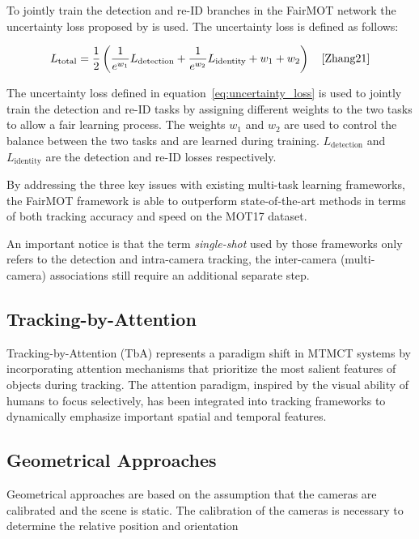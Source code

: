 To jointly train the detection and re-ID branches in the FairMOT network the uncertainty loss proposed by \textcite{Cipolla18} is used. The uncertainty loss is defined as follows:

\begin{equation}
    \label{eq:uncertainty_loss}
    L_{\text{total}}=\frac{1}{2}\left(\frac{1}{e^{w_1}} L_{\text{detection}}+\frac{1}{e^{w_2}} L_{\text{identity}}+w_1+w_2\right)
    \quad\text{\cite[Eq.~5]{Zhang21}}
\end{equation}

The uncertainty loss defined in equation~\ref{eq:uncertainty_loss} is used to jointly train the detection and re-ID tasks by assigning different weights to the two tasks to allow a fair learning process. The weights \(w_1\) and \(w_2\) are used to control the balance between the two tasks and are learned during training. \(L_{\text{detection}}\) and \(L_{\text{identity}}\) are the detection and re-ID losses respectively.

By addressing the three key issues with existing multi-task learning frameworks, the FairMOT framework is able to outperform state-of-the-art methods in terms of both tracking accuracy and speed on the MOT17 dataset.

An important notice is that the term \textit{single-shot} used by those frameworks only refers to the detection and intra-camera tracking, the inter-camera (multi-camera) associations still require an additional separate step.

\subsection{Tracking-by-Attention}\label{subsec:tracking_by_attention}Tracking-by-Attention (TbA) represents a paradigm shift in MTMCT systems by incorporating attention mechanisms that prioritize the most salient features of objects during tracking. The attention paradigm, inspired by the visual ability of humans to focus selectively, has been integrated into tracking frameworks to dynamically emphasize important spatial and temporal features.

\subsection{Geometrical Approaches}\label{subsec:geometrical_approaches}
Geometrical approaches are based on the assumption that the cameras are calibrated and the scene is static. The calibration of the cameras is necessary to determine the relative position and orientation

